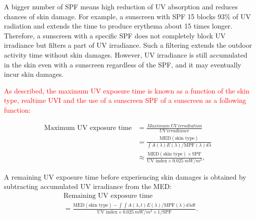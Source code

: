 \documentclass[journal]{IEEEtran}
\begin{document}
A bigger number of SPF means high reduction of UV absorption and reduces chances of skin damage.
For example, a sunscreen with SPF 15 blocks 93\% of UV radiation and extends the time to produce erythema about 15 times longer.
Therefore, a sunscreen with a specific SPF does not completely block UV irradiance but filters a part of UV irradiance.
Such a filtering extends the outdoor activity time without skin damages.
However, UV irradiance is still accumulated in the skin even with a sunscreen regardless of the SPF, and it may eventually incur skin damages.

\textcolor{red}{As described, the maximum UV exposure time is known as a function of the skin type, realtime UVI and the use of a sunscreen SPF of a sunscreen as a following function:}
%

\begin{equation} \label{eq: max_exp_time}
\begin{split}
\text{Maximum~UV~exposure~time}
&= \frac{Maximum~UV~irradiation}{UV~irradiance} \\
&= \frac{\text{MED}(\text{skin~type})}{\int A(\lambda)E(\lambda)  / \text{MPF}(\lambda) d \lambda} \\
&\approx \frac{\text{MED}(\text{skin~type})\times \text{SPF}}{\text{UV~index} \times 0.025~mW/m^2},
\end{split}
\end{equation}


A remaining UV exposure time before experiencing skin damages is obtained by subtracting accumulated UV irradiance from the MED:
%
\begin{equation}
\begin{split}
&\text{Remaining~UV~exposure~time} \\
&= \frac{\text{MED}(\text{skin~type}) - \int \int A(\lambda, t)E(\lambda) / \text{MPF}(\lambda) d \lambda dt}{\text{UV~index} \times 0.025~mW/m^2 \times 1/\text{SPF}}.
\end{split}
\end{equation}
\end{document}
